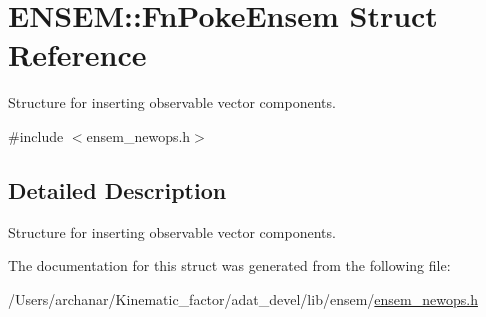 \hypertarget{structENSEM_1_1FnPokeEnsem}{}\section{E\+N\+S\+EM\+:\+:Fn\+Poke\+Ensem Struct Reference}
\label{structENSEM_1_1FnPokeEnsem}


Structure for inserting observable vector components.  




{\ttfamily \#include $<$ensem\+\_\+newops.\+h$>$}



\subsection{Detailed Description}
Structure for inserting observable vector components. 

The documentation for this struct was generated from the following file\+:\begin{DoxyCompactItemize}
\item 
/\+Users/archanar/\+Kinematic\+\_\+factor/adat\+\_\+devel/lib/ensem/\mbox{\hyperlink{lib_2ensem_2ensem__newops_8h}{ensem\+\_\+newops.\+h}}\end{DoxyCompactItemize}
